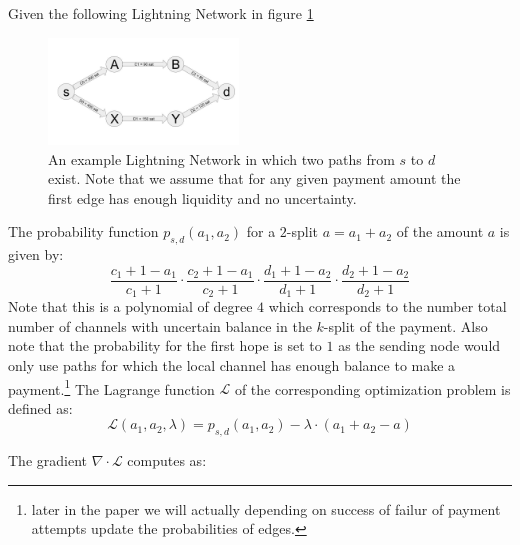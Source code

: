 \documentclass[10pt,twocolumn]{article}
\begin{document}
Given the following Lightning Network in figure \ref{fig:example_LN}
\begin{figure}[htpb]
  \center
  \includegraphics[width=0.45\textwidth]{img/example_LN.jpg}
  \caption{An example Lightning Network in which two paths from $s$ to $d$ exist. Note that we assume that for any given payment amount the first edge has enough liquidity and no uncertainty.}
  \label{fig:example_LN}
\end{figure}
The probability function $p_{s,d}(a_1,a_2)$ for a $2$-split $a=a_1+a_2$ of the amount $a$ is given by:
\[
\frac{c_1+1 - a_1}{c_1+1}\cdot\frac{c_2+1 - a_1}{c_2+1}\cdot\frac{d_1+1 - a_2}{d_1+1}\cdot\frac{d_2+1 - a_2}{d_2+1} 
\]
Note that this is a polynomial of degree $4$ which corresponds to the number total number of channels with uncertain balance in the $k$-split of the payment.
Also note that the probability for the first hope is set to $1$ as the sending node would only use paths for which the local channel has enough balance to make a payment.\footnote{later in the paper we will actually depending on success of failur of payment attempts update the probabilities of edges.}
The Lagrange function $\mathcal{L}$ of the corresponding optimization problem is defined as:
\[
\mathcal{L}(a_1,a_2,\lambda)=p_{s,d}(a_1,a_2) - \lambda\cdot(a_1+a_2-a)
\]

The gradient $\nabla\cdot\mathcal{L}$ computes as:
\end{document}
